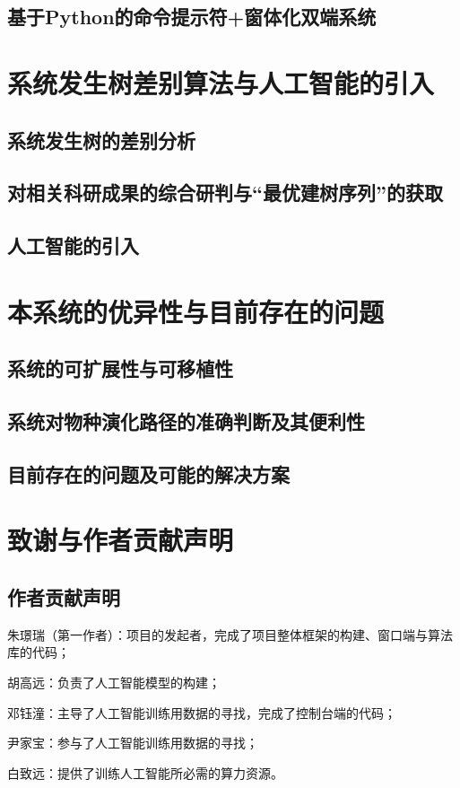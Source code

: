 \documentclass{article}
\begin{document}
\begin{multicols}{2}
\subsection{基于Python的命令提示符+窗体化双端系统}

\section{系统发生树差别算法与人工智能的引入}

\subsection{系统发生树的差别分析}

\subsection{对相关科研成果的综合研判与“最优建树序列”的获取}

\subsection{人工智能的引入}

\section{本系统的优异性与目前存在的问题}

\subsection{系统的可扩展性与可移植性}

\subsection{系统对物种演化路径的准确判断及其便利性}

\subsection{目前存在的问题及可能的解决方案}

\section{致谢与作者贡献声明}

\subsection{作者贡献声明}
\par
朱璟瑞（第一作者）：项目的发起者，完成了项目整体框架的构建、窗口端与算法库的代码；
\par
胡高远：负责了人工智能模型的构建；
\par
邓钰潼：主导了人工智能训练用数据的寻找，完成了控制台端的代码；
\par
尹家宝：参与了人工智能训练用数据的寻找；
\par
白致远：提供了训练人工智能所必需的算力资源。


\end{multicols}
\end{document}
